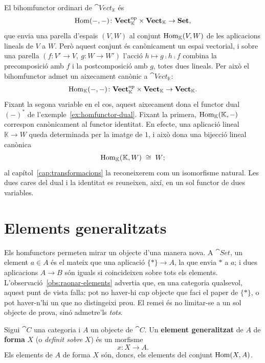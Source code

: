 \begin{exemple}\label{ex:bihom-vect}
El bihomfunctor ordinari de $\cat{Vect}_{\mathbb K}$ és
\[
\operatorname{Hom}(-,-)\colon\mathbf{Vect}_{\mathbb K}^{\mathrm{op}}\times\mathbf{Vect}_{\mathbb K}\to\mathbf{Set},
\]
que envia una parella d'espais $(V,W)$ al conjunt $\operatorname{Hom}_{\mathbb K}(V,W)$ de les aplicacions lineals de $V$ a $W$. Però aquest conjunt és canònicament un espai vectorial, i sobre una parella $(f\colon V'\to V,\ g\colon W\to W')$ l'acció $h\mapsto g\comp h\comp f$ combina la precomposició amb $f$ i la postcomposició amb $g$, totes dues lineals. Per això el bihomfunctor admet un aixecament canònic a $\cat{Vect}_{\mathbb K}$:
\[
\operatorname{Hom}_{\mathbb K}(-,-)\colon\mathbf{Vect}_{\mathbb K}^{\mathrm{op}}\times\mathbf{Vect}_{\mathbb K}\to\mathbf{Vect}_{\mathbb K}.
\]
Fixant la segona variable en el cos, aquest aixecament dona el functor dual $(-)^*$ de l'exemple~\ref{ex:homfunctor-dual}. Fixant la primera, $\operatorname{Hom}_{\mathbb K}(\mathbb K,-)$ correspon canònicament al functor identitat. En efecte, una aplicació lineal $\mathbb K\to W$ queda determinada per la imatge de $1$, i això dona una bijecció lineal canònica
\[
\operatorname{Hom}_{\mathbb K}(\mathbb K,W)\;\cong\;W;
\]
al capítol~\ref{cap:transformacions} la reconeixerem com un isomorfisme natural. Les dues cares del dual i la identitat es reuneixen, així, en un sol functor de dues variables.
\end{exemple}

\section{Elements generalitzats}\label{sec:elements-generalitzats}

Els homfunctors permeten mirar un objecte d'una manera nova. A $\cat{Set}$, un element $a\in A$ és el mateix que una aplicació $\{\ast\}\to A$, la que envia $\ast$ a $a$; i dues aplicacions $A\to B$ són iguals si coincideixen sobre tots els elements. L'observació~\ref{obs:raonar-elements} advertia que, en una categoria qualsevol, aquest punt de vista falla: pot no haver-hi cap objecte que faci el paper de $\{\ast\}$, o pot haver-n'hi un que no distingeixi prou. El remei és no limitar-se a un sol objecte de prova, sinó admetre'ls \emph{tots}.

\begin{definicio}\label{def:element-generalitzat}
Sigui $\cat{C}$ una categoria i $A$ un objecte de $\cat{C}$. Un \textbf{element generalitzat} de $A$ de \textbf{forma} $X$ (o \emph{definit sobre} $X$) és un morfisme
\[
x\colon X\longrightarrow A.
\]
Els elements de $A$ de forma $X$ són, doncs, els elements del conjunt $\operatorname{Hom}(X,A)$.
\end{definicio}

